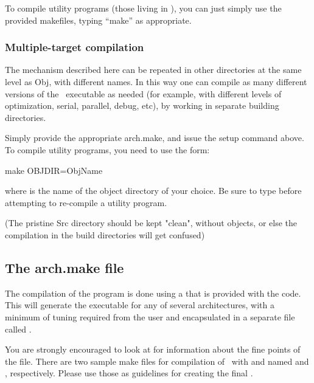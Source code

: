 To compile utility programs (those living in ), you can just
simply use the provided makefiles, typing ``make'' as appropriate.

\subsubsection{Multiple-target compilation}

The mechanism described here can be repeated in other directories at
the same level as Obj, with different names. In this way one can
compile as many different versions of the \siesta\ executable as
needed (for example, with different levels of optimization, serial,
parallel, debug, etc), by working in separate building directories.

Simply provide the appropriate arch.make, and issue the setup command
above. To compile utility programs, you need to use the form:
\begin{shellexample}
   make OBJDIR=ObjName
\end{shellexample}
where  is the name of the object directory of your
choice. Be sure to type  before attempting to
re-compile a utility program.

(The pristine Src directory should be kept "clean", without objects, or else
the compilation in the build directories will get confused)


\subsection{The arch.make file}
\label{sec:arch-make}

The compilation of the program is done using a  that is
provided with the code. This  will
generate the executable for any of several architectures, with a
minimum of tuning required from the user and encapsulated in a
separate file called .

You are strongly encouraged to look at
 for information about the
fine points of the  file. There are two sample make
files for compilation of \siesta\ with  and
 named  and
, respectively. Please use those as guidelines
for creating the final .

  
